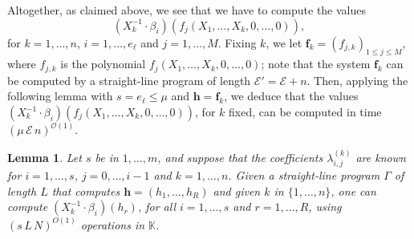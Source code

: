 \documentclass[11pt]{article}
\numberwithin{Property}{section}
\numberwithin{Theorem}{section}
\numberwithin{Proposition}{section}
\newtheorem{Lemma}{Lemma}%
\numberwithin{Lemma}{section}
\numberwithin{Corollary}{section}
\numberwithin{Definition}{section}
\numberwithin{Remark}{section}
\numberwithin{Conjecture}{section}
\numberwithin{Problem}{section}
\numberwithin{Claim}{section}
\theoremstyle{definition}
\numberwithin{Example}{section}
\def\f {\ensuremath{\mathbf{f}}}
\def\h {\ensuremath{\mathbf{h}}}
\renewcommand{\le}{\leqslant}
\renewcommand{\le}{\leqslant} %
\newcommand{\field}{\mathbb{K}} %
\begin{document}
Altogether, as claimed above, we see that we have to compute the values
\[(X_k^{-1} \cdot \beta_i)(f_j(X_1,\dots,X_k,0,\dots,0)),\] for $k=1,\dots,n$, $i=1,\dots,e_\ell$ and $j=1,\dots,M$.  Fixing $k$, we let $\f_k = (f_{j,k})_{1 \le j \le M}$, where $f_{j,k}$ is the polynomial $f_j(X_1,\dots,X_k,0,\dots,0)$; note that the system $\f_k$ can be computed by a straight-line program of length $\mathcal{E}'=\mathcal{E}+n$. Then, applying the following lemma with $s=e_\ell \le \mu$ and $\h = \f_k$, we deduce that the values $(X_k^{-1} \cdot \beta_i)(f_j(X_1,\dots,X_k,0,\dots,0))$, for $k$ fixed, can be computed in time $(\mu\,\mathcal{E}\,n)^{\mathcal{O}(1)}$.

\begin{Lemma} Let $s$ be in $1,\dots,m$, and suppose that the coefficients $\lambda^{(k)}_{i,j}$ are known for $i=1,\dots,s$, $j=0,\dots,i-1$ and $k=1,\dots,n$. Given a straight-line program $\Gamma$ of length $L$ that computes $\h=(h_1,\dots,h_R)$ and given $k$ in $\{1,\dots,n\}$, one can compute $(X_k^{-1}\cdot \beta_i)(h_r)$, for all $i=1,\dots,s$ and $r=1,\dots,R$, using $(s\,L\,N)^{O(1)}$ operations in $\field$.
\end{Lemma}
\end{document}
